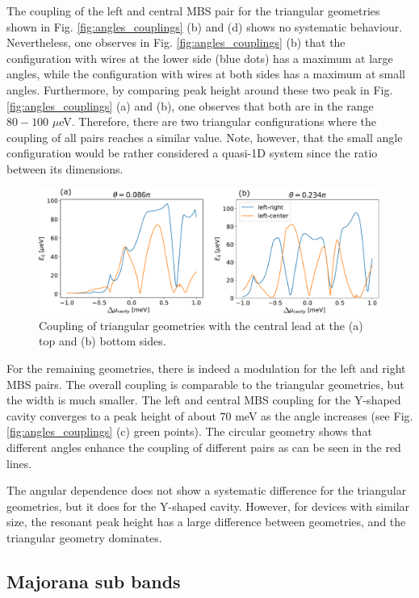 The coupling of the left and central MBS pair for the triangular geometries shown in Fig. \ref{fig:angles_couplings} (b) and (d) shows no systematic behaviour.
Nevertheless, one observes in Fig.  \ref{fig:angles_couplings} (b) that the configuration with wires at the lower side (blue dots) has a maximum at large angles, while the configuration with wires at both sides has a maximum at small angles.
Furthermore, by comparing peak height around these two peak in Fig. \ref{fig:angles_couplings} (a) and (b), one observes that both are in the range $80-100$ $\mu$eV.
Therefore, there are two triangular configurations where the coupling of all pairs reaches a similar value.
Note, however, that the small angle configuration would be rather considered a quasi-1D system since the ratio between its dimensions.

\begin{figure}[h!]
\centering
  \includegraphics[width=0.8\linewidth]{figures/triangle_couplings.pdf}
  \caption{Coupling of triangular geometries with the central lead at the (a) top and (b) bottom sides.}
  \label{fig:triangle_transition}
\end{figure}

For the remaining geometries, there is indeed a modulation for the left and right MBS pairs.
The overall coupling is comparable to the triangular geometries, but the width is much smaller.
The left and central MBS coupling for the Y-shaped cavity converges to a peak height of about $70$ meV as the angle increases (see Fig. \ref{fig:angles_couplings} (c) green points).
The circular geometry shows that different angles enhance the coupling of different pairs as can be seen in the red lines.

The angular dependence does not show a systematic difference for the triangular geometries, but it does for the Y-shaped cavity.
However, for devices with similar size, the resonant peak height has a large difference between geometries, and the triangular geometry dominates.

\subsection{Majorana sub bands}

